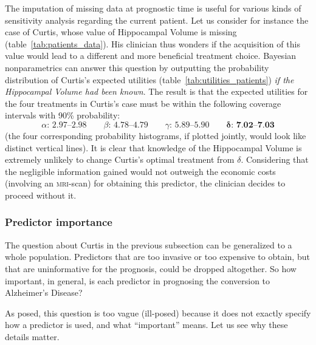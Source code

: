 \documentclass[a4paper,12pt,%
onecolumn,oneside,article,%
british%
]{memoir}
\theoremstyle{remark}
\theoremstyle{innote}
\renewcommand*{\|}[1][]{\nonscript\:#1\vert\nonscript\:\mathopen{}}
\newcommand*{\ad}{Alzheimer's Disease}
\begin{document}
The imputation of missing data at prognostic time is useful for various kinds of sensitivity analysis regarding the current patient. Let us consider for instance the case of Curtis, whose value of Hippocampal Volume is missing (table~\ref{tab:patients_data}). His clinician thus wonders if the acquisition of this value would lead to a different and more beneficial treatment choice. Bayesian nonparametrics can answer this question by outputting the probability distribution of Curtis's expected utilities (table~\ref{tab:utilities_patients}) \emph{if the Hippocampal Volume had been known}. The result is that the expected utilities for the four treatments in Curtis's case must be within the following coverage intervals with 90\% probability:
\begin{equation}
  \label{eq:possible_utilities_curtis}
  \alpha\text{: 2.97--2.98}\qquad
  \beta\text{: 4.78--4.79}\qquad
  \gamma\text{: 5.89--5.90}\qquad
  \bm{\delta}\textbf{: 7.02--7.03}
\end{equation}
(the four corresponding probability histograms, if plotted jointly, would look like distinct vertical lines). It is clear that knowledge of the Hippocampal Volume is extremely unlikely to change Curtis's optimal treatment from $\delta$. Considering that the negligible information gained would not outweigh the economic costs (involving an \textsc{mri}-scan) for obtaining this predictor, the clinician decides to proceed without it.

\subsubsection{Predictor importance}
\label{sec:predictor_importance}


The question about Curtis in the previous subsection can be generalized to a whole population. Predictors that are too invasive or too expensive to obtain, but that are uninformative for the prognosis, could be dropped altogether. So how important, in general, is each predictor in prognosing the conversion to \ad?

As posed, this question is too vague (ill-posed) because it does not exactly specify how a predictor is used, and what \enquote{important} means. Let us see why these details matter.
\end{document}
